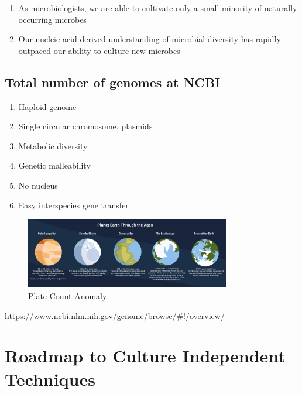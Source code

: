 \documentclass[
]{book}
\providecommand{\tightlist}{%
  \setlength{\itemsep}{0pt}\setlength{\parskip}{0pt}}
\begin{document}
\begin{enumerate}
\def\labelenumi{\arabic{enumi}.}
\setcounter{enumi}{1}
\item
  As microbiologists, we are able to cultivate only a small minority of naturally occurring microbes
\item
  Our nucleic acid derived understanding of microbial diversity has rapidly outpaced our ability to culture new microbes
\end{enumerate}

\hypertarget{total-number-of-genomes-at-ncbi}{%
\subsection{Total number of genomes at NCBI}\label{total-number-of-genomes-at-ncbi}}

\begin{enumerate}
\def\labelenumi{\arabic{enumi}.}
\tightlist
\item
  Haploid genome
\item
  Single circular chromosome, plasmids
\item
  Metabolic diversity
\item
  Genetic malleability
\item
  No nucleus
\item
  Easy interspecies gene transfer
\end{enumerate}

\begin{figure}
\centering
\includegraphics[width=0.8\textwidth,height=\textheight]{./Figures/Planets.png}
\caption{Plate Count Anomaly}
\end{figure}

\url{https://www.ncbi.nlm.nih.gov/genome/browse/\#!/overview/}

\hypertarget{roadmap-to-culture-independent-techniques}{%
\section{Roadmap to Culture Independent Techniques}\label{roadmap-to-culture-independent-techniques}}
\end{document}
